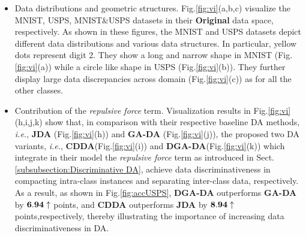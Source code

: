 \documentclass[journal,twocolumn]{IEEEtran}
\begin{document}
\begin{CJK*}{UTF8}{gkai}
\begin{itemize}
	\item Data distributions and geometric structures. Fig.\ref{fig:vi}(a,b,c) visualize the MNIST, USPS,  MNIST$\& $USPS datasets in their \textbf{Original} data space, respectively. As shown in these figures, the MNIST and USPS datasets depict different data distributions and various data structures. In particular, yellow  dots represent digit 2. They show a long and narrow shape in MNIST (Fig.\ref{fig:vi}(a)) while a circle like shape in USPS (Fig.\ref{fig:vi}(b)). They further display large data discrepancies across domain (Fig.\ref{fig:vi}(c)) as for all the other classes.
	
	
    \item Contribution of the \textit{repulsive force} term. Visualization results in Fig.\ref{fig:vi}(h,i,j,k) show that, in comparison with their respective baseline DA methods, \textit{i.e.}, \textbf{JDA} (Fig.\ref{fig:vi}(h)) and \textbf{GA-DA} (Fig.\ref{fig:vi}(j)), the proposed two DA variants, \textit{i.e.}, \textbf{CDDA}(Fig.\ref{fig:vi}(i))  and \textbf{DGA-DA}(Fig.\ref{fig:vi}(k)) which integrate in their model the \textit{repulsive force} term as introduced in Sect.\ref{subsubsection:Discriminative DA}, achieve data discriminativeness in compacting intra-class instances and separating inter-class data, respectively. As a result,  as shown in Fig.\ref{fig:accUSPS}, \textbf{DGA-DA} outperforms \textbf{GA-DA} by ${\bf 6.94}\uparrow$ points, and \textbf{CDDA} outperforms \textbf{JDA} by ${\bf 8.94}\uparrow$ points,respectively, thereby illustrating the importance of increasing data discriminativeness in DA. 
     
      
    
    


\end{itemize}
\end{CJK*}
\end{document}
